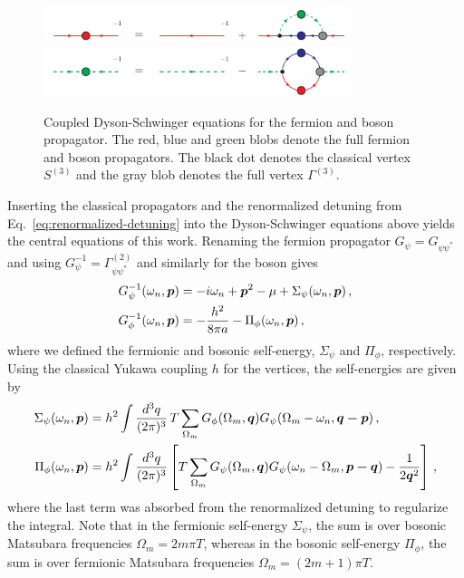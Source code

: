 \begin{figure}[t]
	\begin{center}
		\includegraphics[width=0.8\textwidth]{figs/fermion_prop_DSE.pdf} \\
		\vspace{0.5cm}
		\includegraphics[width=0.8\textwidth]{figs/boson_prop_DSE.pdf} 
	\end{center}
	\caption[Coupled Dyson-Schwinger equations]{Coupled Dyson-Schwinger equations for the fermion and boson propagator. The red, blue and green blobs denote the full fermion and boson propagators. The black dot denotes the classical vertex $S^{(3)}$ and the gray blob denotes the full vertex $\Gamma^{(3)}$.}
	\label{fig:prop_DSEs}
\end{figure}

Inserting the classical propagators and the renormalized detuning from Eq.~\eqref{eq:renormalized-detuning} into the Dyson-Schwinger equations above yields the central equations of this work. Renaming the fermion propagator $G_{\psi} = G_{\psi\psi^*}$ and using $G^{-1}_{\psi} = \Gamma^{(2)}_{\psi\psi^*}$ and similarly for the boson gives
%
\begin{align}
	\label{eq:selfconsistent-equations}
	G^{-1}_{\psi}(\omega_n,\bm{p}) &= -i\omega_n+\bm{p}^2-\mu + \Sigma_{\psi}(\omega_n,\bm{p}) \,, \notag \\
	G^{-1}_{\phi}(\omega_n,\bm{p}) &= -\frac{h^2}{8\pi a} - \Pi_{\phi}(\omega_n,\bm{p}) \,,
\end{align}
%
where we defined the fermionic and bosonic self-energy, $\Sigma_{\psi}$ and $\Pi_{\phi}$, respectively. Using the classical Yukawa coupling $h$ for the vertices, the self-energies are given by
%
\begin{align}
	\label{eq:self-energies}
	\Sigma_{\psi}(\omega_n,\bm{p}) &= h^2 \int\frac{d^{3}q}{(2\pi)^{3}}\,T\sum_{\Omega_m} G_{\phi}(\Omega_m,\bm{q}) G_{\psi}(\Omega_m-\omega_n,\bm{q-p}) \,, \notag \\
	\Pi_{\phi}(\omega_n,\bm{p}) &= h^2 \int\frac{d^{3}q}{(2\pi)^{3}}\left[ T\sum_{\Omega_m} G_{\psi}(\Omega_m,\bm{q}) G_{\psi}(\omega_n-\Omega_m,\bm{p-q}) - \frac{1}{2\bm{q}^2} \right] \,,
\end{align}
%
where the last term was absorbed from the renormalized detuning to regularize the integral. Note that in the fermionic self-energy $\Sigma_{\psi}$, the sum is over bosonic Matsubara frequencies $\Omega_m=2m\pi T$, whereas in the bosonic self-energy $\Pi_{\phi}$, the sum is over fermionic Matsubara frequencies $\Omega_m=(2m+1)\pi T$.

